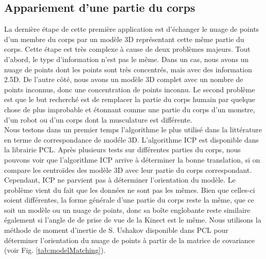 \subsection{Appariement d'une partie du corps}
La dernière étape de cette première application est d'échanger le nuage de points d'un membre du corps par un modèle 3D représentant cette même partie
du corps. Cette étape est très complexe à cause de deux problèmes majeurs. Tout d'abord, le type d'information n'est pas le même. 
Dans un cas, nous avons
un nuage de points dont les points sont très concentrés, mais avec des information 2.5D. De l'autre côté, nous avons un modèle 3D complet avec un nombre de points
inconnus, donc une concentration de points inconnu. Le second problème
est que le but recherché est de remplacer la partie du corps humain par quelque chose de plus improbable et étonnant comme une partie du corps d'un monstre,
d'un robot ou d'un corps dont la musculature est différente.\\


Nous testons dans un premier temps l'algorithme le plus utilisé dans la littérature en terme de correspondance de modéle 3D. L'algorithme ICP\cite{ICP} est
disponible dans la librairie PCL\cite{PCL}. Après plusieurs tests sur différentes parties du corps, nous pouvons voir que l'algorithme ICP arrive à déterminer
la bonne translation, si on compare les centroïdes des modèle 3D avec leur partie du corps correspondant. Cependant, ICP ne parvient pas à déterminer
l'orientation du modèle. Le problème vient du fait que les données ne sont pas les mêmes. Bien que celles-ci soient différentes, la forme générale
d'une partie du corps reste la même, que ce soit un modèle ou un nuage de points, donc sa boîte englobante reste similaire également si l'angle de
de prise de vue de la Kinect est le même. Nous utilisons la méthode
de moment d'inertie de S. Ushakov disponible dans PCL pour déterminer l'orientation du nuage de points à partir de la matrice de covariance
(voir Fig. \ref{tab:modelMatching}).\\

